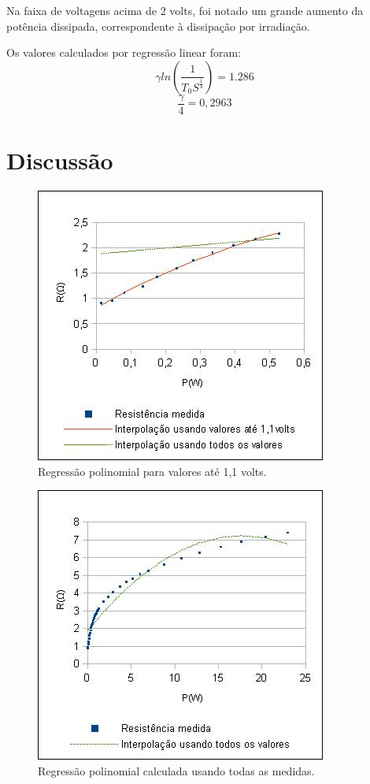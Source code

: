 \documentclass[brazilian,12pt,a4paper,final]{article}
\begin{document}
Na faixa de voltagens acima de 2 volts, foi notado um grande aumento da
potência dissipada, correspondente à dissipação por irradiação.

Os valores calculados por regressão linear foram:
$$\gamma ln(\frac{1}{T_0S^\frac{1}{4}}) = 1.286$$
$$\frac{\gamma}{4}=0,2963$$

\section{Discussão}

\begin{figure}[htbp!]
  \caption{Regressão polinomial para valores até 1,1 volts.}
  \label{figiniciopeq}
  \centering
    \includegraphics{iniciopeq.jpg}
\end{figure}

\begin{figure}[htbp!]
  \caption{Regressão polinomial calculada usando todas as medidas.}
  \label{figiniciogr}
  \centering
    \includegraphics{iniciogr.jpg}
\end{figure}
\end{document}

